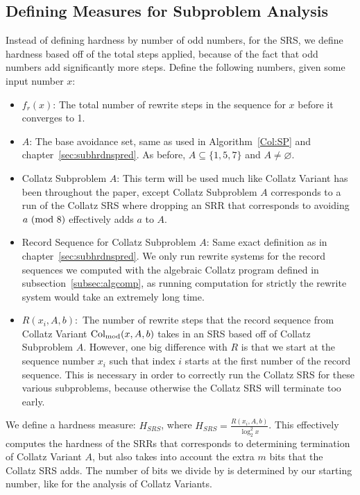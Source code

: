 \subsection{Defining Measures for Subproblem Analysis} \label{subsec:rewritemeasuredefs}
Instead of defining hardness by number of odd numbers, for the SRS, we define hardness based off of the total steps applied, because of the fact that odd numbers add significantly more steps. Define the following numbers, given some input number $x$:
\begin{itemize}
    \item $f_r(x)$: The total number of rewrite steps in the sequence for $x$ before it converges to 1.
    \item $A$: The base avoidance set, same as used in Algorithm~\ref{Col:SP} and chapter~\ref{sec:subhrdnspred}. As before, $A \subseteq \{1, 5, 7\}$ and $A \ne \varnothing$. 
    \item Collatz Subproblem $A$: This term will be used much like Collatz Variant has been throughout the paper, except Collatz Subproblem $A$ corresponds to a run of the Collatz SRS where dropping an SRR that corresponds to avoiding $a \ (\mathrm{mod}\ 8)$  effectively adds $a$ to $A$.
    \item Record Sequence for Collatz Subproblem $A$: Same exact definition as in chapter~\ref{sec:subhrdnspred}. We only run rewrite systems for the record sequences we computed with the algebraic Collatz program defined in subsection~\ref{subsec:algcomp}, as running computation for strictly the rewrite system would take an extremely long time.
    \item $R(x_i, A, b):$ The number of rewrite steps that the record sequence from Collatz Variant $\mathrm{Col}_{\text{mod}}(x,A,b)$ takes in an SRS based off of Collatz Subproblem $A$. However, one big difference with $R$ is that we start at the sequence number $x_i$ such that index $i$ starts at the first number of the record sequence. This is necessary in order to correctly run the Collatz SRS for these various subproblems, because otherwise the Collatz SRS will terminate too early.
\end{itemize}
We define a hardness measure: $H_{SRS}$, where $H_{SRS} = \frac{R(x_i, A, b)}{\log_2^2{x}}$. This effectively computes the hardness of the SRRs that corresponds to determining termination of Collatz Variant $A$, but also takes into account the extra $m$ bits that the Collatz SRS adds. The number of bits we divide by is determined by our starting number, like for the analysis of Collatz Variants.

